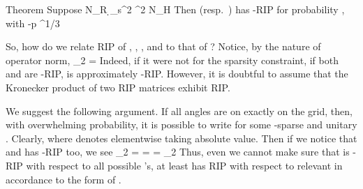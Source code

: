 \Result
{Theorem}
{
Suppose
%
 {
\NC N_R
\geq \NC {} {\d_s^2} ^2 \log N_H \NR
}
%
Then  (resp.\ ) has -RIP for probability , with
 {
 -p
\leq \NC {} ^{1/3} \NR
}
}

\stopsubsection

\startsubsection [title={Confirming the Restricted Isometry}]

So, how do we relate RIP of , , , and  to that of ?
Notice, by the nature of operator norm,
 {
\NC {} _2
=\NC {}  \NR
}
Indeed, if it were not for the sparsity constraint, if both  and  are -RIP,  is approximately -RIP.
However, it is doubtful to assume that the Kronecker product of two RIP matrices exhibit RIP.

We suggest the following argument.
If all angles  are on exactly on the grid, then, with overwhelming probability, it is possible to write
for some -sparse  and unitary .
Clearly,
where  denotes elementwise taking absolute value.
Then if we notice that  and  has -RIP too, we see
 {
\NC \NC {} _2 \NR
%
\NC =\NC {} \NR
%
\NC =\NC {} \NR
%
\NC =\NC {} \D
    \NR
\NC \eqsim \NC {} _2  \NR
}
Thus, even we cannot make sure that  is -RIP with respect to all possible 's, at least  has RIP with respect to relevant  in accordance to the form of .

\stopsubsection

\stopsection
